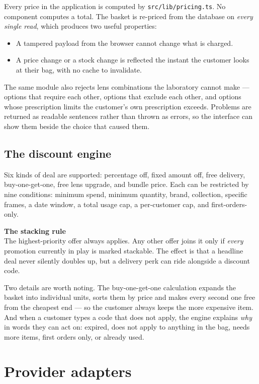 \documentclass[11pt,a4paper]{report}
\newcommand{\code}[1]{\texttt{\small #1}}
\newcommand{\keybox}[2]{%
  \begin{center}
  \begin{minipage}{0.94\textwidth}
  \colorbox{vclight}{\parbox{\dimexpr\textwidth-2\fboxsep}{%
    \vspace{3pt}\textbf{\color{vcblue}#1}\\[3pt]#2\vspace{4pt}}}
  \end{minipage}
  \end{center}}
\begin{document}
Every price in the application is computed by \code{src/lib/pricing.ts}. No
component computes a total. The basket is re-priced from the database on
\emph{every single read}, which produces two useful properties:

\begin{itemize}
  \item A tampered payload from the browser cannot change what is charged.
  \item A price change or a stock change is reflected the instant the customer
        looks at their bag, with no cache to invalidate.
\end{itemize}

The same module also rejects lens combinations the laboratory cannot make ---
options that require each other, options that exclude each other, and options
whose prescription limits the customer's own prescription exceeds. Problems
are returned as readable sentences rather than thrown as errors, so the
interface can show them beside the choice that caused them.

\section{The discount engine}

Six kinds of deal are supported: percentage off, fixed amount off, free
delivery, buy-one-get-one, free lens upgrade, and bundle price. Each can be
restricted by nine conditions: minimum spend, minimum quantity, brand,
collection, specific frames, a date window, a total usage cap, a per-customer
cap, and first-orders-only.

\keybox{The stacking rule}{The highest-priority offer always applies. Any
other offer joins it only if \emph{every} promotion currently in play is
marked stackable. The effect is that a headline deal never silently doubles
up, but a delivery perk can ride alongside a discount code.}

Two details are worth noting. The buy-one-get-one calculation expands the
basket into individual units, sorts them by price and makes every second one
free from the cheapest end --- so the customer always keeps the more expensive
item. And when a customer types a code that does not apply, the engine
explains \emph{why} in words they can act on: expired, does not apply to
anything in the bag, needs more items, first orders only, or already used.

\chapter{Provider adapters}
\end{document}
